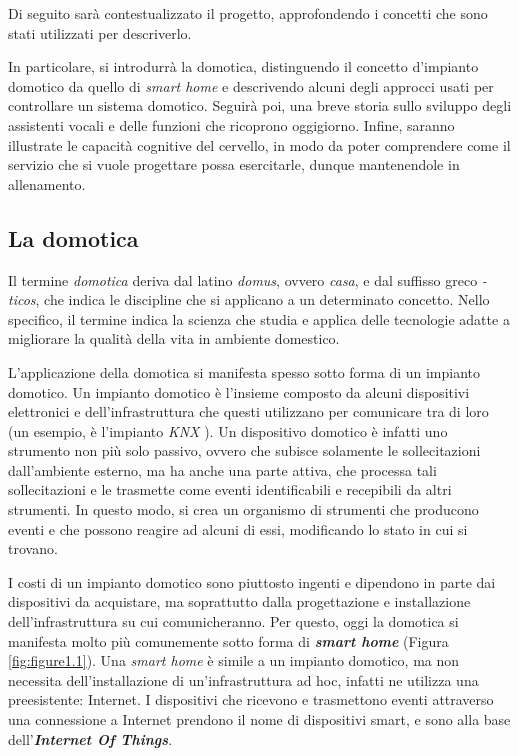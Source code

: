 Di seguito sarà contestualizzato il progetto, approfondendo i concetti che sono
stati utilizzati per descriverlo.

In particolare, si introdurrà la domotica, distinguendo il concetto d'impianto
domotico da quello di \textit{smart home} e descrivendo alcuni degli approcci
usati per controllare un sistema domotico. Seguirà poi, una breve storia sullo
sviluppo degli assistenti vocali e delle funzioni che ricoprono oggigiorno.
Infine, saranno illustrate le capacità cognitive del cervello, in modo da poter
comprendere come il servizio che si vuole progettare possa esercitarle, dunque
mantenendole in allenamento.

\subsection{La domotica}
\label{subsec:Sezione1.2.1}

Il termine \textit{domotica} \cite{DOMOTIC_SYSTEM} deriva dal latino
\textit{domus}, ovvero \textit{casa}, e dal suffisso greco \textit{-ticos}, che
indica le discipline che si applicano a un determinato concetto. Nello
specifico, il termine indica la scienza che studia e applica delle tecnologie
adatte a migliorare la qualità della vita in ambiente domestico.

L’applicazione della domotica si manifesta spesso sotto forma di un impianto
domotico. Un impianto domotico è l’insieme composto da alcuni dispositivi
elettronici e dell’infrastruttura che questi utilizzano per comunicare tra di
loro (un esempio, è l’impianto \textit{KNX} \cite{KONNEX}). Un dispositivo
domotico è infatti uno strumento non più solo passivo, ovvero che subisce
solamente le sollecitazioni dall’ambiente esterno, ma ha anche una parte
attiva, che processa tali sollecitazioni e le trasmette come eventi
identificabili e recepibili da altri strumenti. In questo modo, si crea un
organismo di strumenti che producono eventi e che possono reagire ad alcuni di
essi, modificando lo stato in cui si trovano.

I costi di un impianto domotico sono piuttosto ingenti e dipendono in parte dai
dispositivi da acquistare, ma soprattutto dalla progettazione e installazione
dell’infrastruttura su cui comunicheranno. Per questo, oggi la domotica si
manifesta molto più comunemente sotto forma di \textbf{\textit{smart home}}
(Figura \ref{fig:figure1.1}). Una \textit{smart home} è simile a un impianto
domotico, ma non necessita dell’installazione di un’infrastruttura ad hoc,
infatti ne utilizza una preesistente: Internet. I dispositivi che ricevono e
trasmettono eventi attraverso una connessione a Internet prendono il nome di
dispositivi smart, e sono alla base dell’\textbf{\textit{Internet Of Things}}.

